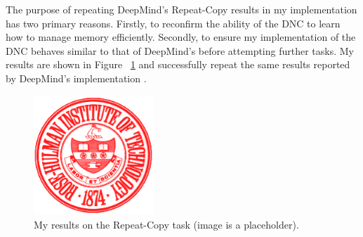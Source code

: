 The purpose of repeating DeepMind's Repeat-Copy results \cite{graves2016hybrid}
in my implementation has two primary reasons. Firstly, to reconfirm the ability of
the DNC to learn how to manage memory efficiently. Secondly, to ensure my
implementation of the DNC behaves similar to that of DeepMind's before
attempting further tasks. My results are shown in Figure ~\ref{fig:repeatCopyResults}
and successfully repeat the same results reported by DeepMind's implementation
\cite{graves2016hybrid}.

\begin{figure}[h]
\includegraphics[width=0.4\textwidth]{../resources/RoseSeal.png}
\caption{My results on the Repeat-Copy task (image is a placeholder).}
\label{fig:repeatCopyResults}
\end{figure}
